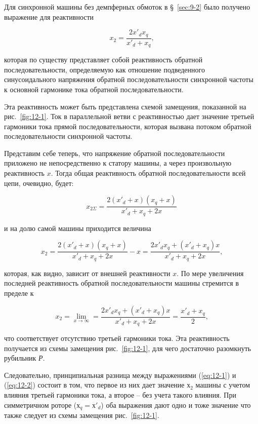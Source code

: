 Для синхронной машины без демпферных обмоток в §~\ref{sec:9-2} было получено выражение для реактивности

\begin{equation}
	x_2 = \frac{2x'_d x_q}{x'_d + x_q} \text{,}
	\label{eq:12-1}
\end{equation}

которая по существу представляет собой реактивность обратной последовательности, определяемую как отношение подведенного синусоидального напряжения обратной последовательности синхронной частоты к основной гармонике тока обратной последовательности.

Эта реактивность может быть представлена схемой замещения, показанной на рис.~\ref{fig:12-1}. Ток в параллельной ветви с реактивностью дает значение третьей гармоники тока прямой последовательности, которая вызвана потоком обратной последовательности синхронной частоты.

Представим себе теперь, что напряжение обратной последовательности приложено не непосредственно к статору машины, а через произвольную реактивность $ x $. Тогда общая реактивность обратной последовательности всей цепи, очевидно, будет:

\begin{equation*}
	x_{2\Sigma}  = \frac{2(x'_d + x) (x_q + x)}{x'_d + x_q + 2x}
\end{equation*}

и на долю самой машины приходится величина

\begin{equation*}
	x_{2}  = \frac{2(x'_d + x) (x_q + x)}{x'_d + x_q + 2x} - x = \frac{2x'_d x_q + (x'_d + x_q) x}{x'_d + x_q + 2x} \text{,}
\end{equation*}

которая, как видно, зависит от внешней реактивности $ x $. По мере увеличения последней реактивность обратной последовательности машины стремится в пределе к

\begin{equation}
	x_{2}  = \lim_{x \rightarrow \infty } = \frac{2x'_d x_q + (x'_d + x_q) x}{x'_d + x_q + 2x} = \frac{x'_d + x_q}{2} \text{,}
	\label{eq:12-2}
\end{equation}

что соответствует отсутствию третьей гармоники тока. Эта реактивность получается из схемы замещения рис.~\ref{fig:12-1}, для чего достаточно разомкнуть рубильник \textit{Р}.

Следовательно, принципиальная разница между выражениями (\ref{eq:12-1}) и (\ref{eq:12-2}) состоит в том, что первое из них дает значение $ х_2 $ машины с учетом влияния третьей гармоники тока, а второе -- без учета такого влияния. При симметричном роторе ($ х_q = х'_d $) оба выражения дают одно и тоже значение что также следует из схемы замещения рис.~\ref{fig:12-1}.

